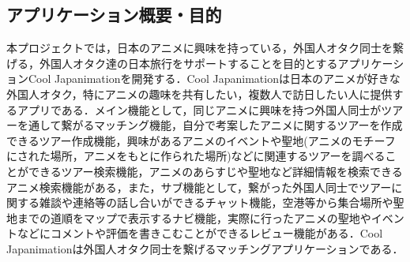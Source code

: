 \subsection{アプリケーション概要・目的}
\par
本プロジェクトでは，日本のアニメに興味を持っている，外国人オタク同士を繋げる，外国人オタク達の日本旅行をサポートすることを目的とするアプリケーションCool Japanimationを開発する．Cool Japanimationは日本のアニメが好きな外国人オタク，特にアニメの趣味を共有したい，複数人で訪日したい人に提供するアプリである．メイン機能として，同じアニメに興味を持つ外国人同士がツアーを通して繋がるマッチング機能，自分で考案したアニメに関するツアーを作成できるツアー作成機能，興味があるアニメのイベントや聖地(アニメのモチーフにされた場所，アニメをもとに作られた場所)などに関連するツアーを調べることができるツアー検索機能，アニメのあらすじや聖地など詳細情報を検索できるアニメ検索機能がある，また，サブ機能として，繋がった外国人同士でツアーに関する雑談や連絡等の話し合いができるチャット機能，空港等から集合場所や聖地までの道順をマップで表示するナビ機能，実際に行ったアニメの聖地やイベントなどにコメントや評価を書きこむことができるレビュー機能がある．Cool Japanimationは外国人オタク同士を繋げるマッチングアプリケーションである．
